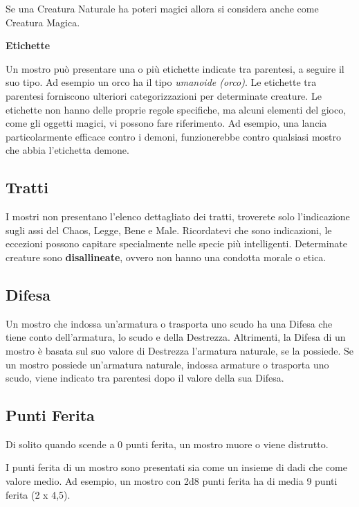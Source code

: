 \begin{multicols}{2}
\begin{itemize}
Se una Creatura Naturale ha poteri magici allora si considera anche come Creatura Magica.
\end{itemize}


\medskip\textbf{Etichette}

Un mostro può presentare una o più etichette indicate tra parentesi, a seguire il suo tipo. Ad esempio un orco ha il tipo \emph{umanoide (orco)}. Le etichette tra parentesi forniscono ulteriori categorizzazioni per determinate creature. Le etichette non hanno delle proprie regole specifiche, ma alcuni elementi del gioco, come gli oggetti magici, vi possono fare riferimento. Ad esempio, una lancia particolarmente efficace contro i demoni, funzionerebbe contro qualsiasi mostro che abbia l'etichetta demone.

\subsection{Tratti}

I mostri non presentano l'elenco dettagliato dei tratti, troverete solo l'indicazione sugli assi del Chaos, Legge, Bene e Male. Ricordatevi che sono indicazioni, le eccezioni possono capitare specialmente nelle specie più intelligenti.
Determinate creature sono \textbf{disallineate}, ovvero non hanno una condotta morale o etica.

\subsection{Difesa}

Un mostro che indossa un'armatura o trasporta uno scudo ha una Difesa che tiene conto dell'armatura, lo scudo e della Destrezza. Altrimenti, la Difesa di un mostro è basata sul suo valore di Destrezza l'armatura naturale, se la possiede. Se un mostro possiede un'armatura naturale, indossa armature o trasporta uno scudo, viene indicato tra parentesi dopo il valore della sua Difesa.

\subsection{Punti Ferita}

Di solito quando scende a 0 punti ferita, un mostro muore o viene distrutto.

I punti ferita di un mostro sono presentati sia come un insieme di dadi che come valore medio. Ad esempio, un mostro con 2d8 punti ferita ha di media 9 punti ferita (2 x 4,5).


\end{multicols}
